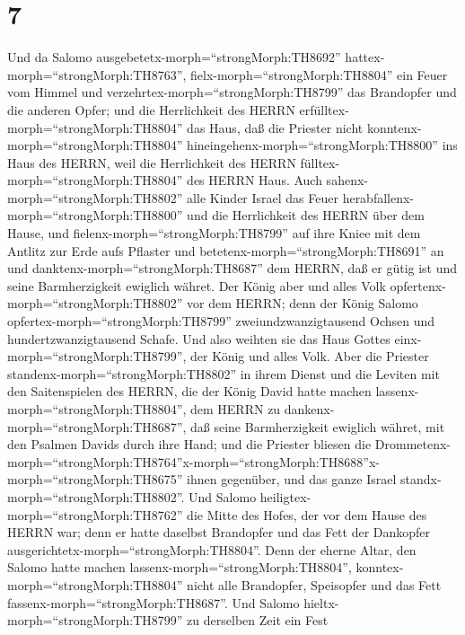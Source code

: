 \hypertarget{section-6}{%
\section{7}\label{section-6}}

 Und da Salomo ausgebetetx-morph=``strongMorph:TH8692''
hattex-morph=``strongMorph:TH8763'', fielx-morph=``strongMorph:TH8804''
ein Feuer vom Himmel und verzehrtex-morph=``strongMorph:TH8799'' das
Brandopfer und die anderen Opfer; und die Herrlichkeit des HERRN
erfülltex-morph=``strongMorph:TH8804'' das Haus,  daß die
Priester nicht konntenx-morph=``strongMorph:TH8804''
hineingehenx-morph=``strongMorph:TH8800'' ins Haus des HERRN, weil die
Herrlichkeit des HERRN fülltex-morph=``strongMorph:TH8804'' des HERRN
Haus.  Auch sahenx-morph=``strongMorph:TH8802'' alle Kinder
Israel das Feuer herabfallenx-morph=``strongMorph:TH8800'' und die
Herrlichkeit des HERRN über dem Hause, und
fielenx-morph=``strongMorph:TH8799'' auf ihre Kniee mit dem Antlitz zur
Erde aufs Pflaster und betetenx-morph=``strongMorph:TH8691'' an und
danktenx-morph=``strongMorph:TH8687'' dem HERRN, daß er gütig ist und
seine Barmherzigkeit ewiglich währet.  Der König aber und
alles Volk opfertenx-morph=``strongMorph:TH8802'' vor dem HERRN;
 denn der König Salomo opfertex-morph=``strongMorph:TH8799''
zweiundzwanzigtausend Ochsen und hundertzwanzigtausend Schafe. Und also
weihten sie das Haus Gottes einx-morph=``strongMorph:TH8799'', der König
und alles Volk.  Aber die Priester
standenx-morph=``strongMorph:TH8802'' in ihrem Dienst und die Leviten
mit den Saitenspielen des HERRN, die der König David hatte machen
lassenx-morph=``strongMorph:TH8804'', dem HERRN zu
dankenx-morph=``strongMorph:TH8687'', daß seine Barmherzigkeit ewiglich
währet, mit den Psalmen Davids durch ihre Hand; und die Priester bliesen
die
Drommetenx-morph=``strongMorph:TH8764''x-morph=``strongMorph:TH8688''\textbar x-morph=``strongMorph:TH8675''
ihnen gegenüber, und das ganze Israel
standx-morph=``strongMorph:TH8802''.  Und Salomo
heiligtex-morph=``strongMorph:TH8762'' die Mitte des Hofes, der vor dem
Hause des HERRN war; denn er hatte daselbst Brandopfer und das Fett der
Dankopfer ausgerichtetx-morph=``strongMorph:TH8804''. Denn der eherne
Altar, den Salomo hatte machen lassenx-morph=``strongMorph:TH8804'',
konntex-morph=``strongMorph:TH8804'' nicht alle Brandopfer, Speisopfer
und das Fett fassenx-morph=``strongMorph:TH8687''.  Und
Salomo hieltx-morph=``strongMorph:TH8799'' zu derselben Zeit ein Fest
